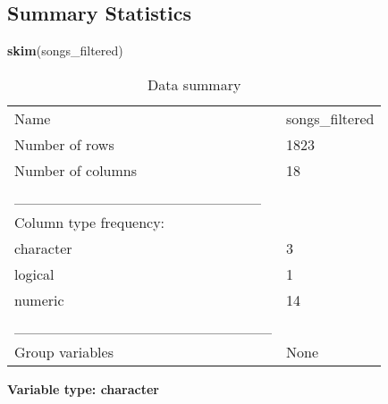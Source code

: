 \documentclass[
]{article}
\newenvironment{Shaded}{\begin{snugshade}}{\end{snugshade}}
\newcommand{\FunctionTok}[1]{\textcolor[rgb]{0.13,0.29,0.53}{\textbf{#1}}}
\newcommand{\NormalTok}[1]{#1}
\begin{document}
\hypertarget{summary-statistics}{%
\subsection{Summary Statistics}\label{summary-statistics}}

\begin{Shaded}
\begin{Highlighting}[]
\FunctionTok{skim}\NormalTok{(songs\_filtered)}
\end{Highlighting}
\end{Shaded}

\begin{longtable}[]{@{}ll@{}}
\caption{Data summary}\tabularnewline
\toprule\noalign{}
\endfirsthead
\endhead
\bottomrule\noalign{}
\endlastfoot
Name & songs\_filtered \\
Number of rows & 1823 \\
Number of columns & 18 \\
\_\_\_\_\_\_\_\_\_\_\_\_\_\_\_\_\_\_\_\_\_\_\_ & \\
Column type frequency: & \\
character & 3 \\
logical & 1 \\
numeric & 14 \\
\_\_\_\_\_\_\_\_\_\_\_\_\_\_\_\_\_\_\_\_\_\_\_\_ & \\
Group variables & None \\
\end{longtable}

\textbf{Variable type: character}
\end{document}
